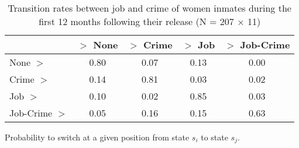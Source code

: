 \begin{table}[htp]
\footnotesize
\setlength{\tabcolsep}{10pt}
\renewcommand{\arraystretch}{1.3}
\begin{threeparttable}
\centering
\caption{Transition rates between job and crime of women inmates \newline
    during the first 12 months following their release (N = 207 $\times$ 11)} 
\label{tab:transition_rates_anyjob_crime}
\begin{tabular}{lcccc}
  \hline
 & $>$ None & $>$ Crime & $>$ Job & $>$ Job-Crime \\ 
  \hline
None $>$ & 0.80 & 0.07 & 0.13 & 0.00 \\ 
  Crime $>$ & 0.14 & 0.81 & 0.03 & 0.02 \\ 
  Job $>$ & 0.10 & 0.02 & 0.85 & 0.03 \\ 
  Job-Crime $>$ & 0.05 & 0.16 & 0.15 & 0.63 \\ 
   \hline
\end{tabular}
\begin{tablenotes}
\scriptsize
\item Probability to switch at a given position from state $s_i$ to state $s_j$.
\end{tablenotes}
\end{threeparttable}
\end{table}
